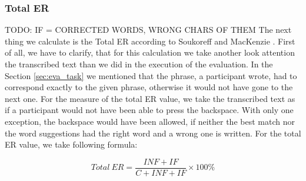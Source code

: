 \subsubsection{Total ER} TODO: IF = CORRECTED WORDS, WRONG CHARS OF THEM
\label{sec:total_er}
The next thing we calculate is the Total ER according to Soukoreff and MacKenzie \cite{10.1145/642611.642632}. First of all, we have to clarify, that for this calculation we take another look attention the transcribed text than we did in the execution of the evaluation. In the Section \ref{sec:eva_task} we mentioned that the phrase, a participant wrote, had to correspond exactly to the given phrase, otherwise it would not have gone to the next one. For the measure of the total ER value, we take the transcribed text as if a participant would not have been able to press the backspace. With only one exception, the backspace would have been allowed, if neither the best match nor the word suggestions had the right word and a wrong one is written. For the total ER value, we take following formula:

\begin{equation}
    Total\ ER = \frac{INF + IF}{C + INF + IF} \times 100\%
\end{equation}


